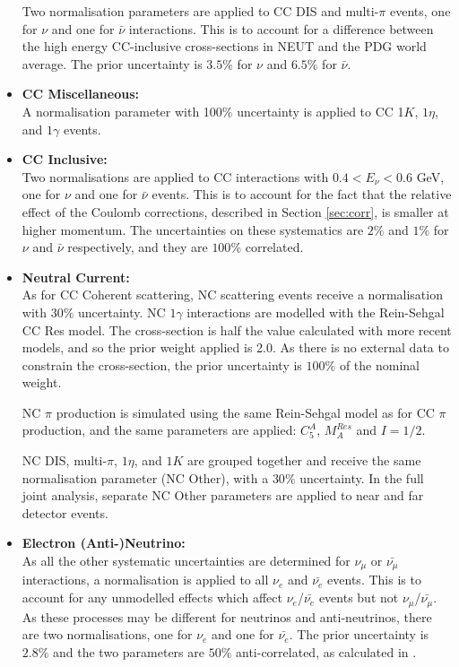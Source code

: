 \begin{itemize}
Two normalisation parameters are applied to CC DIS and multi-$\pi$ events, one for $\nu$ and one for $\bar{\nu}$ interactions. This is to account for a difference between the high energy CC-inclusive cross-sections in NEUT and the PDG world average. The prior uncertainty is $3.5\%$ for $\nu$ and $6.5\%$ for $\bar{\nu}$.

\item \textbf{CC Miscellaneous:}\\
A normalisation parameter with 100$\%$ uncertainty is applied to CC 1$K$, $1\eta$, and $1\gamma$ events.

\item \textbf{CC Inclusive:}\\
Two normalisations are applied to CC interactions with $0.4 < E_{\nu} < 0.6$ GeV, one for $\nu$ and one for $\bar{\nu}$ events. This is to account for the fact that the relative effect of the Coulomb corrections, described in Section \ref{sec:corr}, is smaller at higher momentum. The uncertainties on these systematics are $2\%$ and $1\%$ for $\nu$ and $\bar{\nu}$ respectively, and they are $100\%$ correlated.

\item \textbf{Neutral Current:}\\
As for CC Coherent scattering, NC scattering events receive a normalisation with $30\%$ uncertainty. NC $1\gamma$ interactions are modelled with the Rein-Sehgal CC Res model. The cross-section is half the value calculated with more recent models\cite{NCxsec}, and so the prior weight applied is 2.0. As there is no external data to constrain the cross-section, the prior uncertainty is $100\%$ of the nominal weight.

NC $\pi$ production is simulated using the same Rein-Sehgal model as for CC $\pi$ production, and the same parameters are applied: $C^{A}_{5}$, $M^{Res}_{A}$ and $I=1/2$.

NC DIS, multi-$\pi$, $1\eta$, and $1K$ are grouped together and receive the same normalisation parameter (NC Other), with a $30\%$ uncertainty. In the full joint analysis, separate NC Other parameters are applied to near and far detector events.

\item \textbf{Electron (Anti-)Neutrino:}\\
As all the other systematic uncertainties are determined for $\nu_{\mu}$ or $\bar{\nu_{\mu}}$ interactions, a normalisation is applied to all $\nu_{e}$ and $\bar{\nu_{e}}$ events. This is to account for any unmodelled effects which affect $\nu_{e}$/$\bar{\nu_{e}}$ events but not $\nu_{\mu}$/$\bar{\nu_{\mu}}$. As these processes may be different for neutrinos and anti-neutrinos, there are two normalisations, one for $\nu_{e}$ and one for $\bar{\nu_{e}}$. The prior uncertainty is $2.8\%$ and the two parameters are $50\%$ anti-correlated, as calculated in \cite{nuenuebar}.


\end{itemize}
